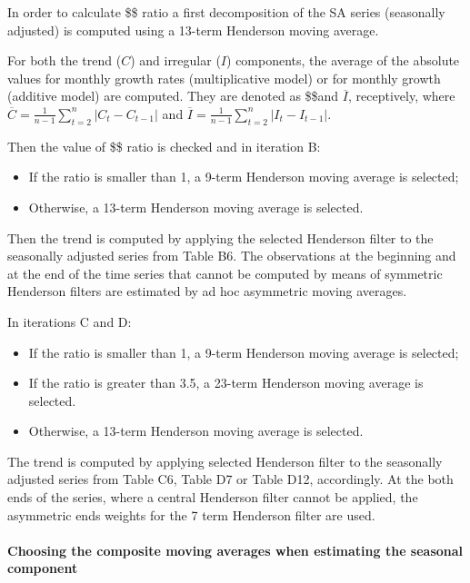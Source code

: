 \documentclass[
  letterpaper,
  DIV=11,
  numbers=noendperiod]{scrreprt}
\let\oldparagraph\paragraph
\renewcommand{\paragraph}[1]{\oldparagraph{#1}\mbox{}}
\begin{document}
In order to calculate \$\$ ratio a
first decomposition of the SA series (seasonally adjusted) is computed
using a 13-term Henderson moving average.

For both the trend (\(C\)) and irregular (\(I\)) components, the average
of the absolute values for monthly growth rates (multiplicative model)
or for monthly growth (additive model) are computed. They are denoted as
\$\$and \(\overline{I}\), receptively, where
\(\overline{C} = \frac{1}{n - 1}\sum_{t = 2}^{n}\left| C_{t} - C_{t - 1} \right|\)
and
\(\overline{I} = \frac{1}{n - 1}\sum_{t = 2}^{n}\left| I_{t} - I_{t - 1} \right|\).

Then the value of \$\$ ratio is checked
and in iteration B:

\begin{itemize}
\item
  If the ratio is smaller than 1, a 9-term Henderson moving average is
  selected;
\item
  Otherwise, a 13-term Henderson moving average is selected.
\end{itemize}

Then the trend is computed by applying the selected Henderson filter to
the seasonally adjusted series from Table B6. The observations at the
beginning and at the end of the time series that cannot be computed by
means of symmetric Henderson filters are estimated by ad hoc asymmetric
moving averages.

In iterations C and D:

\begin{itemize}
\item
  If the ratio is smaller than 1, a 9-term Henderson moving average is
  selected;
\item
  If the ratio is greater than 3.5, a 23-term Henderson moving average
  is selected.
\item
  Otherwise, a 13-term Henderson moving average is selected.
\end{itemize}

The trend is computed by applying selected Henderson filter to the
seasonally adjusted series from Table C6, Table D7 or Table D12,
accordingly. At the both ends of the series, where a central Henderson
filter cannot be applied, the asymmetric ends weights for the 7 term
Henderson filter are used.

\hypertarget{choosing-the-composite-moving-averages-when-estimating-the-seasonal-component}{%
\paragraph{\texorpdfstring{\textbf{Choosing the composite moving
averages when estimating the seasonal
component}}{Choosing the composite moving averages when estimating the seasonal component}}\label{choosing-the-composite-moving-averages-when-estimating-the-seasonal-component}}
\end{document}
